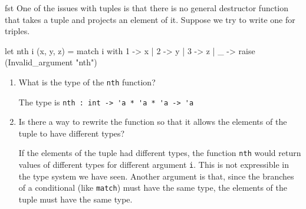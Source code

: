 %
\begin{exercise}{fst}
One of the issues with tuples is that there is no general destructor function that takes a tuple and
projects an element of it.  Suppose we try to write one for triples.

\begin{ocaml}
let nth i (x, y, z) =
   match i with
      1 -> x
    | 2 -> y
    | 3 -> z
    | _ -> raise (Invalid_argument "nth")
\end{ocaml}

\begin{enumerate}
\item What is the type of the \hbox{\lstinline/nth/} function?

\begin{answer}\ifanswers
The type is \hbox{\lstinline/nth : int -> 'a * 'a * 'a -> 'a/}
\fi\end{answer}

\item Is there a way to rewrite the function so that it allows the elements of the tuple to have different types?

\begin{answer}\ifanswers
If the elements of the tuple had different types, the function \hbox{\lstinline/nth/} would return values
of different types for different argument \hbox{\lstinline/i/}.  This is not expressible in the type system we
have seen.  Another argument is that, since the branches of a conditional (like \hbox{\lstinline/match/})
must have the same type, the elements of the tuple must have the same type.
\fi\end{answer}
\end{enumerate}
\end{exercise}

